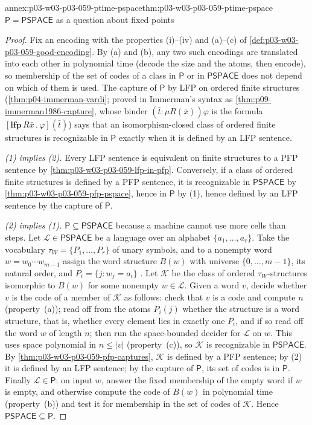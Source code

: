 \begin{annexitem}{annex:p03-w03-p03-059-ptime-pspace}{thm:p03-w03-p03-059-ptime-pspace}{\(\mathsf P=\mathsf{PSPACE}\) as a question about fixed points}
\begin{proof}
Fix an encoding with the properties (i)--(iv) and (a)--(c) of
\cref{def:p03-w03-p03-059-good-encoding}. By (a) and (b), any two such
encodings are translated into each other in polynomial time (decode the
size and the atoms, then encode), so membership of the set of codes of a
class in \(\mathsf P\) or in \(\mathsf{PSPACE}\) does not depend on which
of them is used. The capture of \(\mathsf P\) by LFP on ordered finite
structures \cite[Theorem~3.3.16, p.~157]{Gradel2007FMTDescriptiveChapter}
(\cref{thm:p04-immerman-vardi}; proved in Immerman's syntax as
\cref{thm:p09-immerman1986-capture}, whose binder
\((\bar t:\mu R(\bar x))\varphi\) is the formula
\([\mathbf{lfp}\,R\bar x\,.\,\varphi](\bar t)\)) says that an
isomorphism-closed class of ordered finite structures is recognizable in
\(\mathsf P\) exactly when it is defined by an LFP sentence.

\emph{(1) implies (2).} Every LFP sentence is equivalent on finite
structures to a PFP sentence by \cref{thm:p03-w03-p03-059-lfp-in-pfp}.
Conversely, if a class of ordered finite structures is defined by a PFP
sentence, it is recognizable in \(\mathsf{PSPACE}\) by
\cref{thm:p03-w03-p03-059-pfp-pspace}, hence in \(\mathsf P\) by (1), hence
defined by an LFP sentence by the capture of \(\mathsf P\).

\emph{(2) implies (1).} \(\mathsf P\subseteq\mathsf{PSPACE}\) because a
machine cannot use more cells than steps. Let \(\mathcal L\in\mathsf{PSPACE}\)
be a language over an alphabet \(\{a_1,\ldots,a_r\}\). Take the vocabulary
\(\tau_W=\{P_1,\ldots,P_r\}\) of unary symbols, and to a nonempty word
\(w=w_0\cdots w_{m-1}\) assign the word structure \(B(w)\) with universe
\(\{0,\ldots,m-1\}\), its natural order, and
\(P_i=\{j:w_j=a_i\}\) \cite[p.~137]{Gradel2007FMTDescriptiveChapter}. Let
\(\mathcal K\) be the class of ordered \(\tau_W\)-structures isomorphic to
\(B(w)\) for some nonempty \(w\in\mathcal L\). Given a word \(v\), decide
whether \(v\) is the code of a member of \(\mathcal K\) as follows: check
that \(v\) is a code and compute \(n\) (property~(a)); read off from the
atoms \(P_i(j)\) whether the structure is a word structure, that is,
whether every element lies in exactly one \(P_i\), and if so read off the
word \(w\) of length \(n\); then run the space-bounded decider for
\(\mathcal L\) on \(w\). This uses space polynomial in \(n\leq|v|\)
(property~(c)), so \(\mathcal K\) is recognizable in \(\mathsf{PSPACE}\).
By \cref{thm:p03-w03-p03-059-pfp-captures}, \(\mathcal K\) is defined by a
PFP sentence; by (2) it is defined by an LFP sentence; by the capture of
\(\mathsf P\), its set of codes is in \(\mathsf P\). Finally
\(\mathcal L\in\mathsf P\): on input \(w\), answer the fixed membership
of the empty word if \(w\) is empty, and otherwise compute the code of
\(B(w)\) in polynomial time (property~(b)) and test it for membership in
the set of codes of \(\mathcal K\). Hence
\(\mathsf{PSPACE}\subseteq\mathsf P\).
\end{proof}
\end{annexitem}

